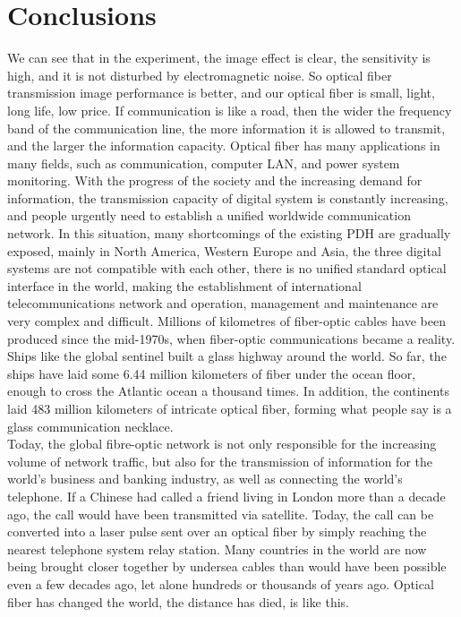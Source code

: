 \documentclass[a4paper]{article}
\begin{document}
\section{Conclusions}
\label{conclusions}
We can see that in the experiment, the image effect is clear, the sensitivity is high, and it is not disturbed by electromagnetic noise. So optical fiber transmission image performance is better, and our optical fiber is small, light, long life, low price. If communication is like a road, then the wider the frequency band of the communication line, the more information it is allowed to transmit, and the larger the information capacity. Optical fiber has many applications in many fields, such as communication, computer LAN, and power system monitoring. With the progress of the society and the increasing demand for information, the transmission capacity of digital system is constantly increasing, and people urgently need to establish a unified worldwide communication network. In this situation, many shortcomings of the existing PDH are gradually exposed, mainly in North America, Western Europe and Asia, the three digital systems are not compatible with each other, there is no unified standard optical interface in the world, making the establishment of international telecommunications network and operation, management and maintenance are very complex and difficult. Millions of kilometres of fiber-optic cables have been produced since the mid-1970s, when fiber-optic communications became a reality. Ships like the global sentinel built a glass highway around the world. So far, the ships have laid some 6.44 million kilometers of fiber under the ocean floor, enough to cross the Atlantic ocean a thousand times. In addition, the continents laid 483 million kilometers of intricate optical fiber, forming what people say is a glass communication necklace. 
\\

Today, the global fibre-optic network is not only responsible for the increasing volume of network traffic, but also for the transmission of information for the world's business and banking industry, as well as connecting the world's telephone. If a Chinese had called a friend living in London more than a decade ago, the call would have been transmitted via satellite. Today, the call can be converted into a laser pulse sent over an optical fiber by simply reaching the nearest telephone system relay station. Many countries in the world are now being brought closer together by undersea cables than would have been possible even a few decades ago, let alone hundreds or thousands of years ago. Optical fiber has changed the world, the distance has died, is like this. \cite{Analogue optical fibre communications}
\\
\end{document}
